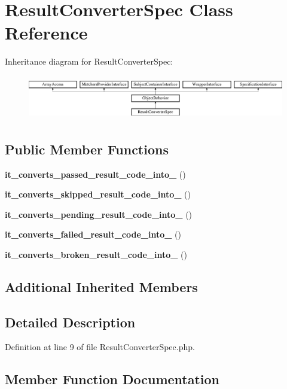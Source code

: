 \section{Result\+Converter\+Spec Class Reference}
\label{classspec_1_1_php_spec_1_1_console_1_1_result_converter_spec}
Inheritance diagram for Result\+Converter\+Spec\+:\begin{figure}[H]
\begin{center}
\leavevmode
\includegraphics[height=1.953488cm]{classspec_1_1_php_spec_1_1_console_1_1_result_converter_spec}
\end{center}
\end{figure}
\subsection*{Public Member Functions}
\begin{DoxyCompactItemize}
\item 
{\bf it\+\_\+converts\+\_\+passed\+\_\+result\+\_\+code\+\_\+into\+\_} ()
\item 
{\bf it\+\_\+converts\+\_\+skipped\+\_\+result\+\_\+code\+\_\+into\+\_} ()
\item 
{\bf it\+\_\+converts\+\_\+pending\+\_\+result\+\_\+code\+\_\+into\+\_} ()
\item 
{\bf it\+\_\+converts\+\_\+failed\+\_\+result\+\_\+code\+\_\+into\+\_} ()
\item 
{\bf it\+\_\+converts\+\_\+broken\+\_\+result\+\_\+code\+\_\+into\+\_} ()
\end{DoxyCompactItemize}
\subsection*{Additional Inherited Members}


\subsection{Detailed Description}


Definition at line 9 of file Result\+Converter\+Spec.\+php.



\subsection{Member Function Documentation}
